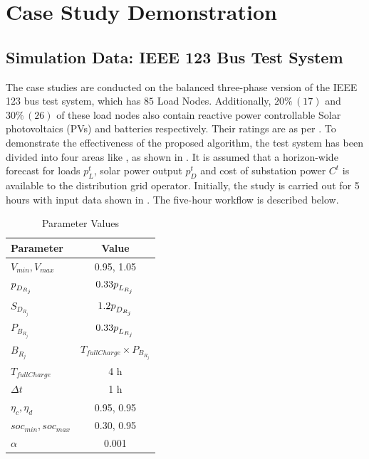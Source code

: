 \documentclass[../../outputs/main.tex]{subfiles}
\begin{document}
\section{Case Study Demonstration}

\subsection{Simulation Data: IEEE 123 Bus Test System}
The case studies are conducted on the balanced three-phase version of the IEEE 123 bus test system, which has $85$ Load Nodes. Additionally, $20 \% \, (17)$ and $30 \% \, (26)$ of these load nodes also contain reactive power controllable Solar photovoltaics (PVs) and batteries respectively. Their ratings are as per . To demonstrate the effectiveness of the proposed algorithm, the test system has been divided into four areas like \cite{Sadnan}, as shown in . It is assumed that a horizon-wide forecast for loads $p^t_L$, solar power output $p^t_D$ and cost of substation power  $C^t$ is available to the distribution grid operator. Initially, the study is carried out for 5 hours with input data shown in . The five-hour workflow is described below. 

\def\ds{\rule{0pt}{1.5ex}} %

\begin{table}[t]
    \centering
    \caption{Parameter Values}
    \begin{tabular}{|l|c|}
    \hline
    \textbf{Parameter} & \textbf{Value} \\ \hline
    $V_{min}, V_{max}$ & 0.95, 1.05 \\ \hline
    $p_{\ds D_{R_j}}$ & $0.33 p_{\ds L_{R_j}}$ \\ \hline
    $S_{D_{R_j}}$ & $1.2 p_{\ds D_{R_j}}$ \\ \hline
    $P_{B_{R_j}}$ & $0.33 p_{\ds L_{R_j}}$ \\ \hline
    $B_{R_j}$ & $T_{fullCharge} \times P_{B_{R_j}}$ \\ \hline
    $T_{fullCharge}$ & 4 h \\ \hline
    $\Delta t$ & 1 h \\ \hline
    $\eta_c, \eta_d$ & 0.95, 0.95 \\ \hline
    $soc_{min}, soc_{max}$ & 0.30, 0.95 \\ \hline
    $\alpha$ & 0.001 \\ \hline
    \end{tabular}
    \label{table:parameter-values}
\end{table}
\end{document}
